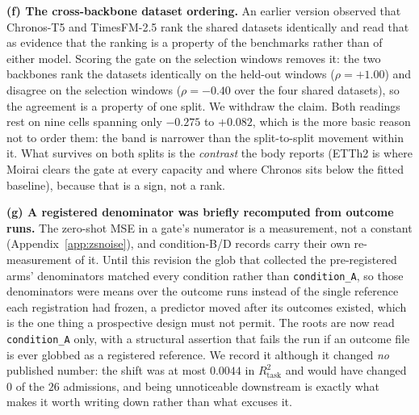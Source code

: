 \textbf{(f) The cross-backbone dataset ordering.} An earlier version observed that
Chronos-T5 and TimesFM-2.5 rank the shared datasets identically and read that as
evidence that the ranking is a property of the benchmarks rather than of either
model. Scoring the gate on the selection windows removes it: the two backbones rank
the datasets identically on the held-out windows ($\rho{=}{+}1.00$) and disagree on the
selection windows ($\rho{=}{-}0.40$ over the four shared datasets), so the agreement
is a property of one split. We withdraw the claim. Both readings rest on nine cells
spanning only $-0.275$ to $+0.082$, which is the more basic reason not to order them:
the band is narrower than the split-to-split movement within it. What survives on both
splits is the \emph{contrast} the body reports (ETTh2 is where Moirai clears the gate
at every capacity and where Chronos sits below the fitted baseline), because that is a
sign, not a rank.

\textbf{(g) A registered denominator was briefly recomputed from outcome runs.}  The
zero-shot MSE in a gate's numerator is a measurement, not a constant
(Appendix~\ref{app:zsnoise}), and condition-B/D records carry their own
re-measurement of it.  Until this revision the glob that collected the
pre-registered arms' denominators matched every condition rather than
\texttt{condition\_A}, so those denominators were means over the outcome runs
instead of the single reference each registration had frozen, a predictor moved
after its outcomes existed, which is the one thing a prospective design must not
permit.  The roots are now read \texttt{condition\_A} only, with a structural
assertion that fails the run if an outcome file is ever globbed as a registered
reference.  We record it although it changed \emph{no} published number: the shift
was at most $0.0044$ in $R^2_\text{task}$ and would have changed $0$ of the $26$
admissions, and being unnoticeable downstream is exactly what makes it worth
writing down rather than what excuses it.

